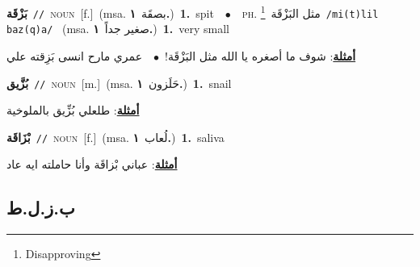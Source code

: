 \documentclass[10pt,a4paper,twoside]{article} %
\begin{document}
\begin{multicols}{2}
{\setlength\topsep{0pt}\textbf{\foreignlanguage{arabic}{بَزْقَة}}\ {\color{gray}\texttt{//}\color{black}}\ \textsc{noun}\ [f.]\ \color{gray}(msa. \foreignlanguage{arabic}{بصقَة}~\foreignlanguage{arabic}{\textbf{١.}})\color{black}\ \textbf{1.}~spit\ \ $\bullet$\ \ \textsc{ph.} \color{gray} \foreignlanguage{arabic}{مثل البَزْقَة}\color{black}\ \footnote{Disapproving}\ {\color{gray}\texttt{/{\sffamily mi(t)lil baz(q)a}/}\color{black}}\ \color{gray} (msa. \foreignlanguage{arabic}{صغير جداً}~\foreignlanguage{arabic}{\textbf{١.}})\color{black}\ \textbf{1.}~very small\  \begin{flushright}\color{gray}\foreignlanguage{arabic}{\textbf{\underline{\foreignlanguage{arabic}{أمثلة}}}: شوف ما أصغره يا الله مثل البَزْقَة!\ $\bullet$\ \  عمري مارح انسى بَزِقته علي}\end{flushright}\color{black}} \vspace{2mm}

{\setlength\topsep{0pt}\textbf{\foreignlanguage{arabic}{بُزَّيق}}\ {\color{gray}\texttt{//}\color{black}}\ \textsc{noun}\ [m.]\ \color{gray}(msa. \foreignlanguage{arabic}{حَلَزون}~\foreignlanguage{arabic}{\textbf{١.}})\color{black}\ \textbf{1.}~snail\  \begin{flushright}\color{gray}\foreignlanguage{arabic}{\textbf{\underline{\foreignlanguage{arabic}{أمثلة}}}: طلعلي بُزِّيق بالملوخية}\end{flushright}\color{black}} \vspace{2mm}

{\setlength\topsep{0pt}\textbf{\foreignlanguage{arabic}{بْزَاقَة}}\ {\color{gray}\texttt{//}\color{black}}\ \textsc{noun}\ [f.]\ \color{gray}(msa. \foreignlanguage{arabic}{لُعاب}~\foreignlanguage{arabic}{\textbf{١.}})\color{black}\ \textbf{1.}~saliva\  \begin{flushright}\color{gray}\foreignlanguage{arabic}{\textbf{\underline{\foreignlanguage{arabic}{أمثلة}}}: عباني بْزاقَة وأنا حاملته ايه عاد}\end{flushright}\color{black}} \vspace{2mm}

\vspace{-3mm}
\subsection*{\color{blue}\foreignlanguage{arabic}{ب.ز.ل.ط}\color{blue}{}} 


\end{multicols}
\end{document}
